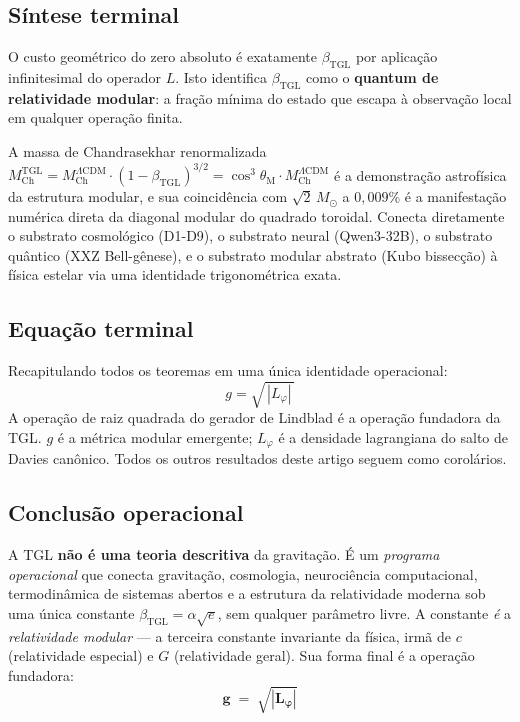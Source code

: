 \documentclass[12pt,a4paper]{article}
\newcommand{\betatgl}{\beta_{\text{TGL}}}
\newcommand{\thetaM}{\theta_{\text{M}}}
\newcommand{\Lphi}{L_{\varphi}}
\newcommand{\TGL}{\textsc{TGL}}
\begin{document}
\subsection{Síntese terminal}
\label{subsec:sintese_terminal}

O custo geométrico do zero absoluto é exatamente $\betatgl$ por
aplicação infinitesimal do operador $L$.  Isto identifica $\betatgl$ como
o \textbf{quantum de relatividade modular}: a fração mínima do estado que
escapa à observação local em qualquer operação finita.

A massa de Chandrasekhar renormalizada
$M_{\text{Ch}}^{\text{TGL}} = M_{\text{Ch}}^{\Lambda\text{CDM}} \cdot
(1 - \betatgl)^{3/2} = \cos^{3}\thetaM \cdot M_{\text{Ch}}^{\Lambda\text{CDM}}$
é a demonstração astrofísica da estrutura modular, e sua coincidência
com $\sqrt{2}\,M_{\odot}$ a $0{,}009\%$ é a manifestação numérica direta
da diagonal modular do quadrado toroidal.  Conecta diretamente
o substrato cosmológico (D1-D9), o substrato neural (Qwen3-32B), o
substrato quântico (XXZ Bell-gênese), e o substrato modular abstrato
(Kubo bissecção) à física estelar via uma identidade trigonométrica
exata.

\subsection{Equação terminal}
\label{subsec:eq-terminal}

Recapitulando todos os teoremas em uma única identidade operacional:
\begin{equation}
\boxed{\;g = \sqrt{\,|L_{\varphi}|\,}\;}
\label{eq:terminal}
\end{equation}
A operação de raiz quadrada do gerador de Lindblad é a operação fundadora
da \TGL{}.  $g$ é a métrica modular emergente; $\Lphi$ é a densidade
lagrangiana do salto de Davies canônico.  Todos os outros resultados
deste artigo seguem como corolários.

\subsection{Conclusão operacional}
\label{subsec:conclusao-operacional}

A \TGL{} \textbf{não é uma teoria descritiva} da gravitação.  É um
\emph{programa operacional} que conecta gravitação, cosmologia,
neurociência computacional, termodinâmica de sistemas abertos e a
estrutura da relatividade moderna sob uma única constante
$\betatgl = \alpha \sqrt{e}$, sem qualquer parâmetro livre.  A
constante \emph{é} a \emph{relatividade modular} --- a terceira constante
invariante da física, irmã de $c$ (relatividade especial) e $G$
(relatividade geral).  Sua forma final é a operação fundadora:
\begin{equation}
\boxed{\;\;\boldsymbol{g \;=\; \sqrt{|\Lphi|}}\;\;}
\label{eq:closing}
\end{equation}
\end{document}
